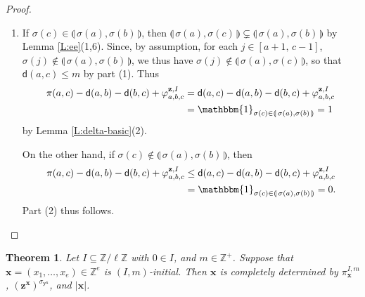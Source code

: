 \documentclass[11pt,a4paper,reqno]{amsart}
\numberwithin{equation}{section}
\theoremstyle{plain}
\newtheorem{thm}{Theorem}[section]
\theoremstyle{definition}
\theoremstyle{remark}
\numberwithin{equation}{section}
\newcommand{\bbone}{\mathbbm{1}}
\newcommand{\bx}{\mathbf{x}}
\newcommand{\by}{\mathbf{y}}
\newcommand{\bz}{\mathbf{z}}
\newcommand{\ZZ}{\mathbb{Z}}
\newcommand{\ff}{\varphi}
\newcommand{\dd}{\mathsf{d}}
\newcommand{\ft}[2]{\llparenthesis\, #1,#2 \,\rrparenthesis}
\begin{document}
\begin{proof}
\begin{enumerate}
\item
If $\sigma(c) \in \ft{\sigma(a)}{\sigma(b)}$, then
$\ft{\sigma(a)}{\sigma(c)} \subsetneq \ft{\sigma(a)}{\sigma(b)}$ by Lemma \ref{L:ee}(1,6).
Since, by assumption, for each $j \in [a+1,\, c-1]$, $\sigma(j)\notin \ft{\sigma(a)}{\sigma(b)}$, we thus have
$\sigma(j) \notin \ft{\sigma(a)}{\sigma(c)}$, so that
$\dd(a,c) \leq m$ by part (1).
Thus
\begin{align*}
\pi(a,c) - \dd(a,b) - \dd(b,c) + \ff^{\bz,I}_{a,b,c} &= \dd(a,c) - \dd(a,b) - \dd(b,c) + \ff^{\bz,I}_{a,b,c} \\
&= \bbone_{\sigma(c) \in \ft{\sigma(a)}{\sigma(b)}} = 1
\end{align*}
by Lemma \ref{L:delta-basic}(2).

On the other hand, if $\sigma(c) \notin \ft{\sigma(a)}{\sigma(b)}$,
then
\begin{align*}
\pi(a,c) - \dd(a,b) - \dd(b,c) + \ff^{\bz,I}_{a,b,c} &\leq \dd(a,c) - \dd(a,b) - \dd(b,c) + \ff^{\bz,I}_{a,b,c} \\
&= \bbone_{\sigma(c) \in \ft{\sigma(a)}{\sigma(b)}} = 0.
\end{align*}
Part (2) thus follows.
\end{enumerate}
\end{proof}

\begin{thm} \label{T:unique-initial}
Let $I \subseteq \ZZ/\ell\ZZ$ with $0 \in I$, and $m \in \ZZ^+$.
Suppose that $\bx= (x_1,\dotsc, x_e) \in \ZZ^e$ is $(I,m)$-initial.
Then $\bx$ is completely determined by $\pi_{\bx}^{I,m}$, $(\bz^{\bx})^{\sigma_{\by^{\bx}}}$, and $|\bx|$. \end{thm}
\end{document}
